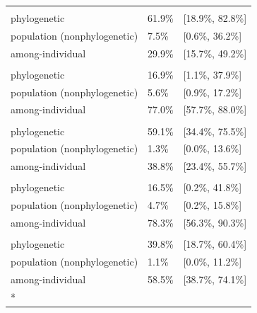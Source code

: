 \documentclass[
  letterpaper,
  DIV=11,
  numbers=noendperiod]{scrartcl}
\begin{document}
\begin{longtable}{lll}
\endfoot
\bottomrule
\endlastfoot
\addlinespace[0.3em]
\multicolumn{3}{l}{\textbf{$\log \left( l_\mathrm{gc} \right)$}}\\
\hspace{1em}phylogenetic & 61.9\% & {}[18.9\%, 82.8\%]\\
\hspace{1em}population (nonphylogenetic) & 7.5\% & {}[0.6\%, 36.2\%]\\
\hspace{1em}among-individual & 29.9\% & {}[15.7\%, 49.2\%]\\
\addlinespace[0.3em]
\multicolumn{3}{l}{\textbf{$\log \left( g_\mathrm{i} \right)$}}\\
\hspace{1em}phylogenetic & 16.9\% & {}[1.1\%, 37.9\%]\\
\hspace{1em}population (nonphylogenetic) & 5.6\% & {}[0.9\%, 17.2\%]\\
\hspace{1em}among-individual & 77.0\% & {}[57.7\%, 88.0\%]\\
\addlinespace[0.3em]
\multicolumn{3}{l}{\textbf{$\log \left( g_\mathrm{max} \right)$}}\\
\hspace{1em}phylogenetic & 59.1\% & {}[34.4\%, 75.5\%]\\
\hspace{1em}population (nonphylogenetic) & 1.3\% & {}[0.0\%, 13.6\%]\\
\hspace{1em}among-individual & 38.8\% & {}[23.4\%, 55.7\%]\\
\addlinespace[0.3em]
\multicolumn{3}{l}{\textbf{$\log \left( \lambda \right)$}}\\
\hspace{1em}phylogenetic & 16.5\% & {}[0.2\%, 41.8\%]\\
\hspace{1em}population (nonphylogenetic) & 4.7\% & {}[0.2\%, 15.8\%]\\
\hspace{1em}among-individual & 78.3\% & {}[56.3\%, 90.3\%]\\
\addlinespace[0.3em]
\multicolumn{3}{l}{\textbf{$\log \left( \tau \right)$}}\\
\hspace{1em}phylogenetic & 39.8\% & {}[18.7\%, 60.4\%]\\
\hspace{1em}population (nonphylogenetic) & 1.1\% & {}[0.0\%, 11.2\%]\\
\hspace{1em}among-individual & 58.5\% & {}[38.7\%, 74.1\%]\\*

\end{longtable}
\end{document}
